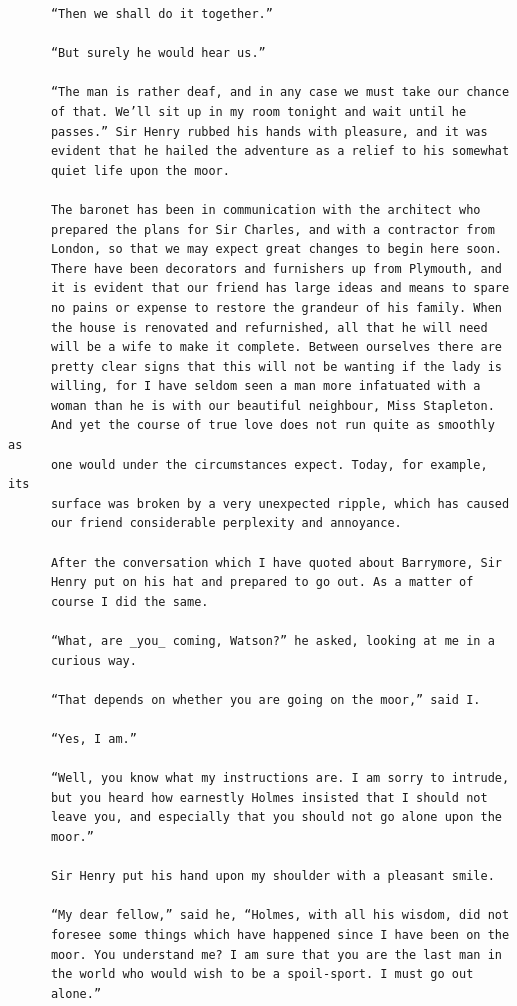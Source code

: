 \documentclass{article}
\begin{document}
\begin{verbatim}
      “Then we shall do it together.”

      “But surely he would hear us.”

      “The man is rather deaf, and in any case we must take our chance
      of that. We’ll sit up in my room tonight and wait until he
      passes.” Sir Henry rubbed his hands with pleasure, and it was
      evident that he hailed the adventure as a relief to his somewhat
      quiet life upon the moor.

      The baronet has been in communication with the architect who
      prepared the plans for Sir Charles, and with a contractor from
      London, so that we may expect great changes to begin here soon.
      There have been decorators and furnishers up from Plymouth, and
      it is evident that our friend has large ideas and means to spare
      no pains or expense to restore the grandeur of his family. When
      the house is renovated and refurnished, all that he will need
      will be a wife to make it complete. Between ourselves there are
      pretty clear signs that this will not be wanting if the lady is
      willing, for I have seldom seen a man more infatuated with a
      woman than he is with our beautiful neighbour, Miss Stapleton.
      And yet the course of true love does not run quite as smoothly as
      one would under the circumstances expect. Today, for example, its
      surface was broken by a very unexpected ripple, which has caused
      our friend considerable perplexity and annoyance.

      After the conversation which I have quoted about Barrymore, Sir
      Henry put on his hat and prepared to go out. As a matter of
      course I did the same.

      “What, are _you_ coming, Watson?” he asked, looking at me in a
      curious way.

      “That depends on whether you are going on the moor,” said I.

      “Yes, I am.”

      “Well, you know what my instructions are. I am sorry to intrude,
      but you heard how earnestly Holmes insisted that I should not
      leave you, and especially that you should not go alone upon the
      moor.”

      Sir Henry put his hand upon my shoulder with a pleasant smile.

      “My dear fellow,” said he, “Holmes, with all his wisdom, did not
      foresee some things which have happened since I have been on the
      moor. You understand me? I am sure that you are the last man in
      the world who would wish to be a spoil-sport. I must go out
      alone.”


\end{verbatim}
\end{document}
